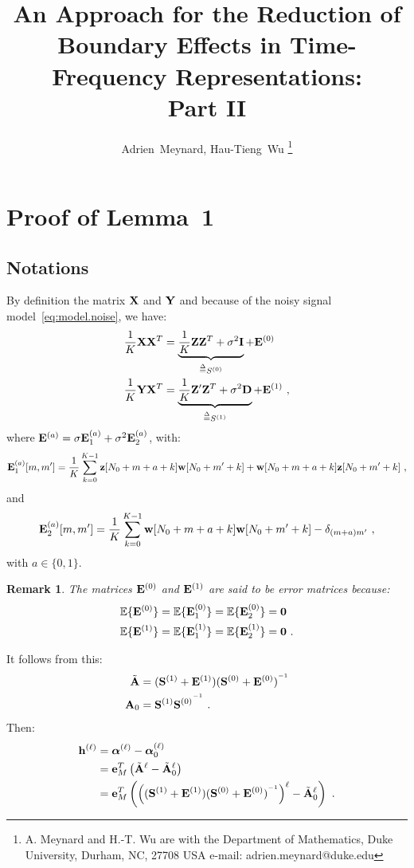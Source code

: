 \documentclass[journal, onecolumn]{IEEEtran}
\title{An Approach for the Reduction of Boundary Effects in Time-Frequency Representations:\\ Part II}
\author{Adrien~Meynard, %
        Hau-Tieng~Wu
\thanks{A. Meynard and H.-T. Wu are with the Department
of Mathematics, Duke University, Durham,
NC, 27708 USA e-mail: adrien.meynard@duke.edu}}
\newtheorem{remark}{Remark}
\begin{document}
\maketitle


\section{Proof of Lemma~1}
\label{ap:lm.error}

\subsection{Notations}
By definition the matrix ${\mathbf X}$ and ${\mathbf Y}$ and because of the noisy signal model~\eqref{eq:model.noise}, we have:
\begin{align}
\dfrac1K{\mathbf X}{\mathbf X}^T &= \underbrace{\dfrac1K{\mathbf Z}{\mathbf Z}^T+\sigma^2{\mathbf I}}_{\overset{\Delta}{=} S^{(0)}} + {\mathbf E}^{(0)} \\
\dfrac1K{\mathbf Y}{\mathbf X}^T &= \underbrace{\dfrac1K{\mathbf Z}'{\mathbf Z}^T +\sigma^2{\mathbf D}}_{\overset{\Delta}{=} S^{(1)}}+ {\mathbf E}^{(1)} \ ,
\end{align}
where ${\mathbf E}^{(a)} = \sigma{\mathbf E}_1^{(a)} + \sigma^2{\mathbf E}_2^{(a)}$, with:
\[
{\mathbf E}_1^{(a)}[m,m'] = \dfrac1K\sum_{k=0}^{K-1} {\mathbf z}[N_0+m+a+k]{\mathbf w}[N_0+m'+k] + {\mathbf w}[N_0+m+a+k]{\mathbf z}[N_0+m'+k]\ ,
\]
and
\[
{\mathbf E}_2^{(a)}[m,m'] =  \dfrac1K\sum_{k=0}^{K-1} {\mathbf w}[N_0+m+a+k]{\mathbf w}[N_0+m'+k] - \delta_{(m+a)m'}\ ,
\]
with $a\in\{0,1\}$.

\begin{remark}
The matrices ${\mathbf E}^{(0)}$ and ${\mathbf E}^{(1)}$ are said to be error matrices because:
\begin{align*}
{\mathbb E}\{{\mathbf E}^{(0)}\} &= {\mathbb E}\{{\mathbf E}_1^{(0)}\} = {\mathbb E}\{{\mathbf E}_2^{(0)}\} = \boldsymbol{0} \\
{\mathbb E}\{{\mathbf E}^{(1)}\} &= {\mathbb E}\{{\mathbf E}_1^{(1)}\} = {\mathbb E}\{{\mathbf E}_2^{(1)}\} = \boldsymbol{0}\ .
\end{align*}
\end{remark}

It follows from this:
\begin{align*}
\tilde{{\mathbf A}} &= ({\mathbf S}^{(1)}+{\mathbf E}^{(1)})({\mathbf S}^{(0)}+{\mathbf E}^{(0)})^{^{-1}} \\
{\mathbf A}_0 &={\mathbf S}^{(1)}{{\mathbf S}^{(0)}}^{^{-1}}\ .
\end{align*}
Then:
\begin{align}
\nonumber
\bh^{(\ell)} &= \balpha^{(\ell)} - \balpha^{(\ell)}_0 \\
\nonumber
&= \be_M^T\left(\tilde\bA^\ell-\tilde\bA_0^\ell\right) \\
&= \be_M^T\left(\left((\bS^{(1)}+\bE^{(1)})(\bS^{(0)}+\bE^{(0)})^\inv\right)^\ell- \tilde\bA_0^\ell\right)\ .
\label{eq:error.vec}
\end{align}
\end{document}
